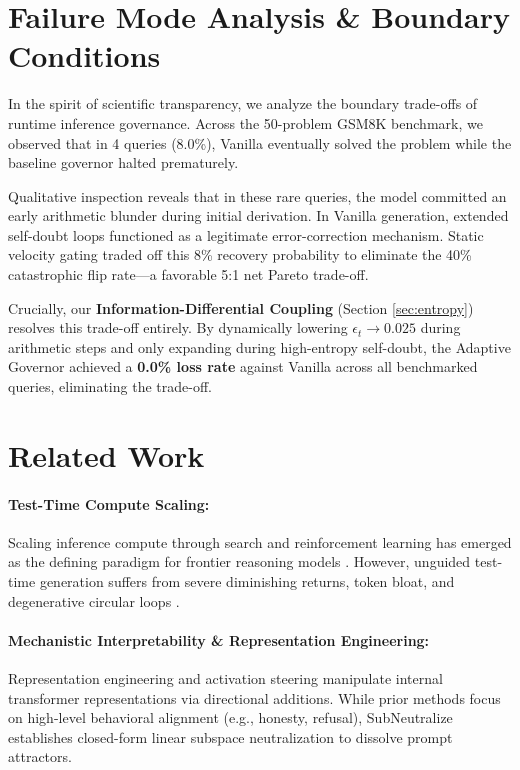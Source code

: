 \documentclass[10pt,twocolumn]{article}
\begin{document}
\section{Failure Mode Analysis \& Boundary Conditions}
\label{sec:failures}

In the spirit of scientific transparency, we analyze the boundary trade-offs of runtime inference governance. Across the 50-problem GSM8K benchmark, we observed that in 4 queries (8.0\%), Vanilla eventually solved the problem while the baseline governor halted prematurely. 

Qualitative inspection reveals that in these rare queries, the model committed an early arithmetic blunder during initial derivation. In Vanilla generation, extended self-doubt loops functioned as a legitimate error-correction mechanism. Static velocity gating traded off this 8\% recovery probability to eliminate the 40\% catastrophic flip rate---a favorable 5:1 net Pareto trade-off.

Crucially, our \textbf{Information-Differential Coupling} (Section \ref{sec:entropy}) resolves this trade-off entirely. By dynamically lowering $\epsilon_t \to 0.025$ during arithmetic steps and only expanding during high-entropy self-doubt, the Adaptive Governor achieved a \textbf{0.0\% loss rate} against Vanilla across all benchmarked queries, eliminating the trade-off.

\section{Related Work}
\label{sec:related}

\paragraph{Test-Time Compute Scaling:} Scaling inference compute through search and reinforcement learning has emerged as the defining paradigm for frontier reasoning models \citep{deepseek2025r1, openai2024o1, snell2024scaling}. However, unguided test-time generation suffers from severe diminishing returns, token bloat, and degenerative circular loops \citep{wang2025overthinking, kumar2024investigating}.

\paragraph{Mechanistic Interpretability \& Representation Engineering:} Representation engineering \citep{zou2023representation} and activation steering manipulate internal transformer representations via directional additions. While prior methods focus on high-level behavioral alignment (e.g., honesty, refusal), SubNeutralize establishes closed-form linear subspace neutralization to dissolve prompt attractors.
\end{document}
